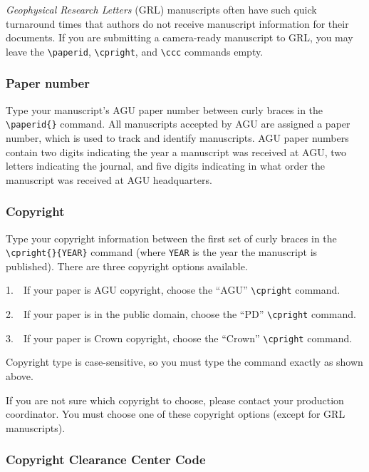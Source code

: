 \begin{article}
{\it Geophysical Research Letters} (GRL) manuscripts often 
have such quick turnaround times that authors do not 
receive manuscript information for their documents.
If you are submitting a camera-ready manuscript to GRL,
you may leave the \verb"\paperid", \verb"\cpright",
and \verb"\ccc" commands empty.


\subsubsection{Paper number}

Type your manuscript's AGU paper number between 
curly braces in the \verb"\paperid{}" command.  All 
manuscripts accepted by AGU are assigned a paper number, 
which is used to track and identify manuscripts.  AGU 
paper numbers contain two digits indicating the year a
manuscript was received at AGU, two letters indicating 
the journal, and five digits indicating in what order 
the manuscript was received at AGU headquarters.


\subsubsection{Copyright}

Type your copyright information between the first
set of curly braces in the \verb"\cpright{}{YEAR}" 
command (where {\tt YEAR} is the year the manuscript
is published).  There are three copyright options 
available.
\vspace{11pt}

1.~~If your paper is AGU copyright, choose 
the  ``AGU'' \verb"\cpright" command.
\vspace{11pt}

2.~~If your paper is in the public domain, 
choose the ``PD'' \verb"\cpright" command.
\vspace{11pt}

3.~~If your paper is Crown copyright, 
choose the ``Crown'' \verb"\cpright" command.
\vspace{11pt}

Copyright type is case-sensitive, so you must
type the command exactly as shown above.

If you are not sure which copyright to choose, 
please contact your production coordinator.
You must choose one of these copyright options 
(except for GRL manuscripts).


\subsubsection{Copyright Clearance Center Code}


\end{article}
